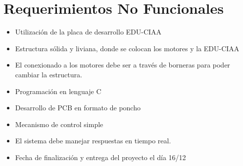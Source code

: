 \section{Requerimientos No Funcionales}

\begin{itemize}
	\item Utilización de la placa de desarrollo EDU-CIAA
	\item Estructura sólida y liviana, donde se colocan los motores y la EDU-CIAA
	\item El conexionado a los motores debe ser a través de borneras para poder cambiar la estructura.
	\item Programación en lenguaje C
	\item Desarrollo de PCB en formato de poncho
	\item Mecanismo de control simple
	\item El sistema debe manejar respuestas en tiempo real.
	\item Fecha de finalización y entrega del proyecto el día 16/12
	
\end{itemize}
